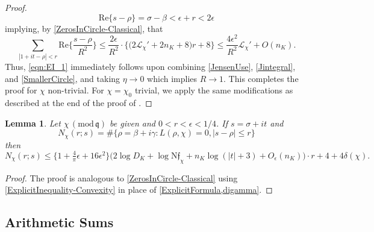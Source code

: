 \documentclass[12pt,psamsfonts]{amsart}
\newtheorem{lem}[thm]{Lemma}
\theoremstyle{definition}
\theoremstyle{remark}
\numberwithin{equation}{section}
\theoremstyle{plain}
\theoremstyle{remark}
\renewcommand{\1}{ {\bf 1}}
\newcommand{\kf}{\mathfrak{f}}
\newcommand{\cL}{\mathcal{L}}
\renewcommand{\pmod}[1]{\, (\mathrm{mod} {\, #1})}
\newcommand{\N}{\mathrm{N}}
\newcommand{\kq}{\mathfrak{q}}
\renewcommand{\Re}{\mathrm{Re}}
\begin{document}
\begin{proof}
\[
\Re \{ s- \rho  \} = \sigma - \beta < \epsilon + r< 2\epsilon
\]
implying, by \cref{ZerosInCircle-Classical}, that 
\begin{equation}
\sum_{|1+it-\rho| < r} \Re\big\{ \frac{s-\rho}{R^2} \} \leq \frac{2\epsilon}{R^2} \cdot  \big\{ \big(2\cL_{\chi}' + 2n_K + 8\big) r + 8\big\} \leq \frac{4 \epsilon^2}{R^2} \cL_{\chi}' + O(n_K).
\label{SmallerCircle}
\end{equation}
Thus, \eqref{eqn:EI_1} immediately follows upon combining \eqref{JensenUse}, \eqref{Jintegral}, and \eqref{SmallerCircle}, and taking $\eta \rightarrow 0$ which implies $R \rightarrow 1$. This completes the proof for $\chi$ non-trivial. For $\chi = \chi_0$ trivial, we apply the same modifications as described at the end of the proof of \cite[Lemma 4.3]{Zaman_2015a}. 
\end{proof}


\begin{lem} \label{ZerosInCircle-Convexity} Let $\chi \pmod{\kq}$ be given and $0 < r < \epsilon < 1/4$. If $s = \sigma+it$ and
\[
N_{\chi}(r; s) = \#\{ \rho = \beta + i\gamma : L(\rho, \chi) = 0, |s-\rho| \leq r\}
\]
then
\[
N_{\chi}(r; s) \leq \{ 1 +  \tfrac{4}{\pi}\epsilon + 16 \epsilon^2\}   \big( 2 \log D_K  +  \log \N\kf_{\chi} +  n_K \log( |t|+ 3) + O_{\epsilon}(n_K) \big) \cdot r+ 4 + 4\delta(\chi). 
\]
\end{lem}
\begin{proof} The proof is analogous to \cref{ZerosInCircle-Classical} using \cref{ExplicitInequality-Convexity} in place of \cref{ExplicitFormula,digamma}.   
\end{proof}



\subsection{Arithmetic Sums} 
\end{document}
